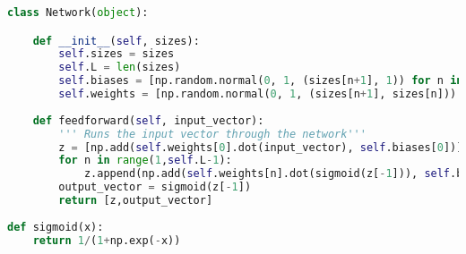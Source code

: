 \documentclass[10pt]{article}
\begin{document}
\begin{lstlisting}[language=Python, breaklines, basicstyle=\small]
class Network(object):

	def __init__(self, sizes):
		self.sizes = sizes
		self.L = len(sizes)
		self.biases = [np.random.normal(0, 1, (sizes[n+1], 1)) for n in range(len(sizes)-1)]
		self.weights = [np.random.normal(0, 1, (sizes[n+1], sizes[n])) for n in range(len(sizes)-1)]
	
	def feedforward(self, input_vector):
		''' Runs the input vector through the network'''
		z = [np.add(self.weights[0].dot(input_vector), self.biases[0])]
		for n in range(1,self.L-1):
			z.append(np.add(self.weights[n].dot(sigmoid(z[-1])), self.biases[n]))
		output_vector = sigmoid(z[-1])
		return [z,output_vector]
		
def sigmoid(x):
	return 1/(1+np.exp(-x))
\end{lstlisting}
\end{document}
